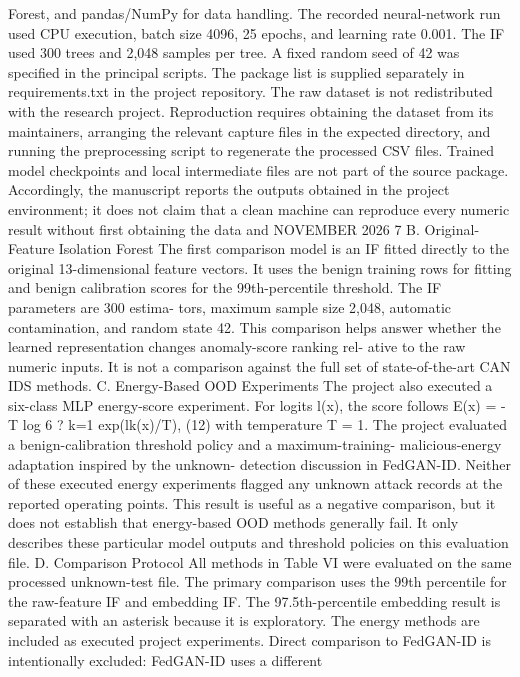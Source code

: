 \documentclass[
]{article}
\begin{document}
Forest, and pandas/NumPy for data handling. The recorded neural-network
run used CPU execution, batch size 4096, 25 epochs, and learning rate
0.001. The IF used 300 trees and 2,048 samples per tree. A fixed random
seed of 42 was specified in the principal scripts. The package list is
supplied separately in requirements.txt in the project repository. The
raw dataset is not redistributed with the research project. Reproduction
requires obtaining the dataset from its maintainers, arranging the
relevant capture files in the expected directory, and running the
preprocessing script to regenerate the processed CSV files. Trained
model checkpoints and local intermediate files are not part of the
source package. Accordingly, the manuscript reports the outputs obtained
in the project environment; it does not claim that a clean machine can
reproduce every numeric result without first obtaining the data and
NOVEMBER 2026 7 B. Original-Feature Isolation Forest The first
comparison model is an IF fitted directly to the original 13-dimensional
feature vectors. It uses the benign training rows for fitting and benign
calibration scores for the 99th-percentile threshold. The IF parameters
are 300 estima- tors, maximum sample size 2,048, automatic
contamination, and random state 42. This comparison helps answer whether
the learned representation changes anomaly-score ranking rel- ative to
the raw numeric inputs. It is not a comparison against the full set of
state-of-the-art CAN IDS methods. C. Energy-Based OOD Experiments The
project also executed a six-class MLP energy-score experiment. For
logits l(x), the score follows E(x) = -T log 6 ? k=1 exp(lk(x)/T), (12)
with temperature T = 1. The project evaluated a benign-calibration
threshold policy and a maximum-training- malicious-energy adaptation
inspired by the unknown- detection discussion in FedGAN-ID. Neither of
these executed energy experiments flagged any unknown attack records at
the reported operating points. This result is useful as a negative
comparison, but it does not establish that energy-based OOD methods
generally fail. It only describes these particular model outputs and
threshold policies on this evaluation file. D. Comparison Protocol All
methods in Table VI were evaluated on the same processed unknown-test
file. The primary comparison uses the 99th percentile for the
raw-feature IF and embedding IF. The 97.5th-percentile embedding result
is separated with an asterisk because it is exploratory. The energy
methods are included as executed project experiments. Direct comparison
to FedGAN-ID is intentionally excluded: FedGAN-ID uses a different
\end{document}

